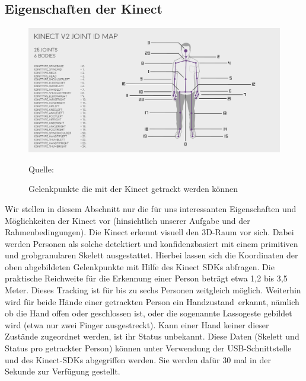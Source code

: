 \subsection{Eigenschaften der Kinect} 
\begin{figure}[htbp] 
  \centering
     \includegraphics[width=\textwidth]{pictures/kinectskeleton-map2.png}
     
  \caption{Gelenkpunkte die mit der Kinect getrackt werden können}
  \footnotesize Quelle: \cite{tracking2}
  \label{fig:Bild1}
\end{figure}

	Wir stellen in diesem Abschnitt nur die für uns interessanten Eigenschaften und Möglichkeiten der Kinect vor (hinsichtlich unserer Aufgabe und der Rahmenbedingungen). Die Kinect erkennt visuell den 3D-Raum vor sich. Dabei werden Personen als solche detektiert und konfidenzbasiert mit einem primitiven und grobgranularen Skelett ausgestattet. Hierbei lassen sich die Koordinaten der oben abgebildeten Gelenkpunkte mit Hilfe des Kinect SDKs abfragen. Die praktische Reichweite für die Erkennung einer Person beträgt etwa 1,2 bis 3,5 Meter. Dieses Tracking ist für bis zu sechs Personen zeitgleich möglich. Weiterhin wird für beide Hände einer getrackten Person ein \glqq Handzustand\grqq~erkannt, nämlich ob die Hand offen oder geschlossen ist, oder die sogenannte Lassogeste gebildet wird (etwa nur zwei Finger ausgestreckt). Kann einer Hand keiner dieser Zustände zugeordnet werden, ist ihr Status unbekannt. Diese Daten (Skelett und Status pro getrackter Person) können unter Verwendung der USB-Schnittstelle und des Kinect-SDKs abgegriffen werden. Sie werden dafür 30 mal in der Sekunde zur Verfügung gestellt.